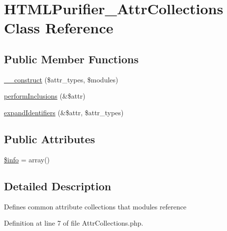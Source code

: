 \hypertarget{classHTMLPurifier__AttrCollections}{\section{H\+T\+M\+L\+Purifier\+\_\+\+Attr\+Collections Class Reference}
\label{classHTMLPurifier__AttrCollections}
}
\subsection*{Public Member Functions}
\begin{DoxyCompactItemize}
\item 
\hyperlink{classHTMLPurifier__AttrCollections_a96838bb7ed7cc2ca7d5297570b7d783b}{\+\_\+\+\_\+construct} (\$attr\+\_\+types, \$modules)
\item 
\hyperlink{classHTMLPurifier__AttrCollections_a8ce2225ead783c0c9cfb48735d965e33}{perform\+Inclusions} (\&\$attr)
\item 
\hyperlink{classHTMLPurifier__AttrCollections_a206c1287255373a31cb8534da5eb7c5d}{expand\+Identifiers} (\&\$attr, \$attr\+\_\+types)
\end{DoxyCompactItemize}
\subsection*{Public Attributes}
\begin{DoxyCompactItemize}
\item 
\hyperlink{classHTMLPurifier__AttrCollections_a588bcab5f5978c50456dbba61e695900}{\$info} = array()
\end{DoxyCompactItemize}


\subsection{Detailed Description}
Defines common attribute collections that modules reference 

Definition at line 7 of file Attr\+Collections.\+php.



